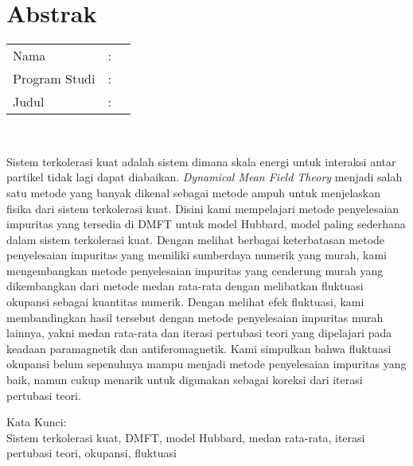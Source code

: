 %
%
%

\chapter*{Abstrak}

\vspace*{0.2cm}

\noindent \begin{tabular}{l l p{10cm}}
	Nama&: & \penulis \\
	Program Studi&: & \program \\
	Judul&: & \judul \\
\end{tabular} \\ 

\vspace*{0.5cm}

\noindent Sistem terkolerasi kuat adalah sistem dimana skala energi untuk interaksi antar partikel tidak lagi dapat diabaikan. \textit{Dynamical Mean Field Theory} menjadi salah satu metode yang banyak dikenal sebagai metode ampuh untuk menjelaskan fisika dari sistem terkolerasi kuat. Disini kami mempelajari metode penyelesaian impuritas yang tersedia di DMFT untuk model Hubbard, model paling sederhana dalam sistem terkolerasi kuat. Dengan melihat berbagai keterbatasan metode penyelesaian impuritas yang memiliki sumberdaya numerik yang murah, kami mengembangkan metode penyelesaian impuritas yang cenderung murah yang dikembangkan dari metode medan rata-rata dengan melibatkan fluktuasi okupansi sebagai kuantitas numerik. Dengan melihat efek fluktuasi, kami membandingkan hasil tersebut dengan metode penyelesaian impuritas murah lainnya, yakni medan rata-rata dan iterasi pertubasi teori yang dipelajari pada keadaan paramagnetik dan antiferomagnetik. Kami simpulkan bahwa fluktuasi okupansi belum sepenuhnya mampu menjadi metode penyelesaian impuritas yang baik, namun cukup menarik untuk digunakan sebagai koreksi dari iterasi pertubasi teori.\\

\vspace*{0.2cm}

\noindent Kata Kunci: \\ 
\noindent Sistem terkolerasi kuat, DMFT, model Hubbard, medan rata-rata, iterasi pertubasi teori, okupansi, fluktuasi \\

\newpage